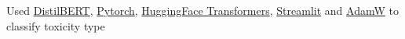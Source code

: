 {Used \href{https://huggingface.co/docs/transformers/model_doc/distilbert}{DistilBERT}, \href{https://pytorch.org/}{Pytorch}, \href{https://huggingface.co/docs/transformers/index}{HuggingFace Transformers}, \href{https://streamlit.io/}{Streamlit} and \href{https://pytorch.org/docs/stable/generated/torch.optim.AdamW.html}{AdamW} to classify toxicity type}

